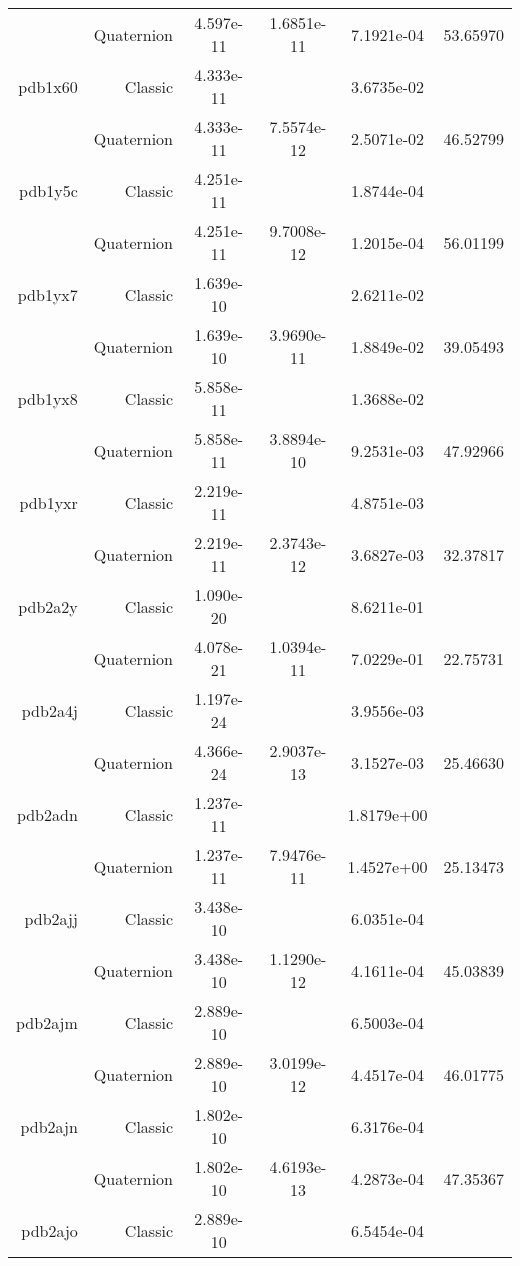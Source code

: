 \begin{xltabular}{\textwidth}{r|rS[table-format=1.3e+2]S[table-format=1.4e+2]S[table-format=1.4e+2]S[table-format=-1.5]}
& Quaternion & 4.597e-11 & 1.6851e-11 & 7.1921e-04 & 53.65970\\  \addlinespace
pdb1x60 & Classic & 4.333e-11 &  & 3.6735e-02 & \\
& Quaternion & 4.333e-11 & 7.5574e-12 & 2.5071e-02 & 46.52799\\  \addlinespace
pdb1y5c & Classic & 4.251e-11 &  & 1.8744e-04 & \\
& Quaternion & 4.251e-11 & 9.7008e-12 & 1.2015e-04 & 56.01199\\  \addlinespace
pdb1yx7 & Classic & 1.639e-10 &  & 2.6211e-02 & \\
& Quaternion & 1.639e-10 & 3.9690e-11 & 1.8849e-02 & 39.05493\\  \addlinespace
pdb1yx8 & Classic & 5.858e-11 &  & 1.3688e-02 & \\
& Quaternion & 5.858e-11 & 3.8894e-10 & 9.2531e-03 & 47.92966\\  \addlinespace
pdb1yxr & Classic & 2.219e-11 &  & 4.8751e-03 & \\
& Quaternion & 2.219e-11 & 2.3743e-12 & 3.6827e-03 & 32.37817\\  \addlinespace
pdb2a2y & Classic & 1.090e-20 &  & 8.6211e-01 & \\
& Quaternion & 4.078e-21 & 1.0394e-11 & 7.0229e-01 & 22.75731\\  \addlinespace
pdb2a4j & Classic & 1.197e-24 &  & 3.9556e-03 & \\
& Quaternion & 4.366e-24 & 2.9037e-13 & 3.1527e-03 & 25.46630\\  \addlinespace
pdb2adn & Classic & 1.237e-11 &  & 1.8179e+00 & \\
& Quaternion & 1.237e-11 & 7.9476e-11 & 1.4527e+00 & 25.13473\\  \addlinespace
pdb2ajj & Classic & 3.438e-10 &  & 6.0351e-04 & \\
& Quaternion & 3.438e-10 & 1.1290e-12 & 4.1611e-04 & 45.03839\\  \addlinespace
pdb2ajm & Classic & 2.889e-10 &  & 6.5003e-04 & \\
& Quaternion & 2.889e-10 & 3.0199e-12 & 4.4517e-04 & 46.01775\\  \addlinespace
pdb2ajn & Classic & 1.802e-10 &  & 6.3176e-04 & \\
& Quaternion & 1.802e-10 & 4.6193e-13 & 4.2873e-04 & 47.35367\\  \addlinespace
pdb2ajo & Classic & 2.889e-10 &  & 6.5454e-04 & \\

\end{xltabular}
